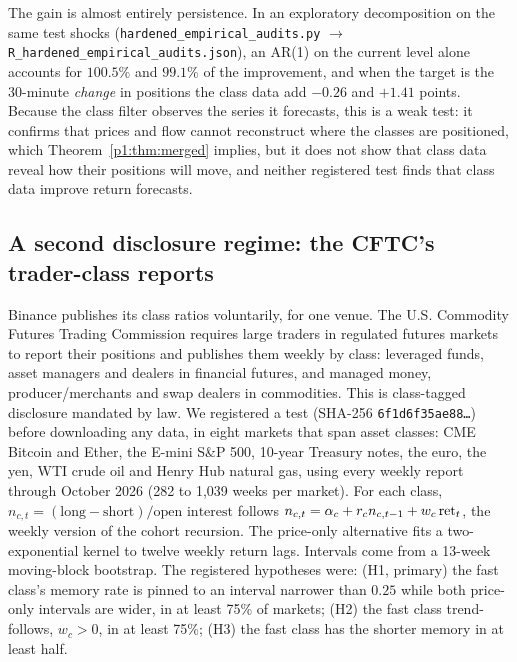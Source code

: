 The gain is almost entirely persistence. In an exploratory decomposition on the same test shocks (\texttt{hardened\_empirical\_audits.py} $\to$ \texttt{R\_hardened\_empirical\_audits.json}), an AR(1) on the current level alone accounts for $100.5\%$ and $99.1\%$ of the improvement, and when the target is the 30-minute \emph{change} in positions the class data add $-0.26$ and $+1.41$ points. Because the class filter observes the series it forecasts, this is a weak test: it confirms that prices and flow cannot reconstruct where the classes are positioned, which Theorem~\ref{p1:thm:merged} implies, but it does not show that class data reveal how their positions will move, and neither registered test finds that class data improve return forecasts.

\subsection{A second disclosure regime: the CFTC's trader-class reports}\label{p1:sec:cot}

Binance publishes its class ratios voluntarily, for one venue. The U.S. Commodity Futures Trading Commission requires large traders in regulated futures markets to report their positions and publishes them weekly by class: leveraged funds, asset managers and dealers in financial futures, and managed money, producer/merchants and swap dealers in commodities. This is class-tagged disclosure mandated by law. We registered a test (SHA-256 \texttt{6f1d6f35ae88\ldots}) before downloading any data, in eight markets that span asset classes: CME Bitcoin and Ether, the E-mini S\&P 500, 10-year Treasury notes, the euro, the yen, WTI crude oil and Henry Hub natural gas, using every weekly report through October 2026 (282 to 1{,}039 weeks per market). For each class, $n_{c,t}=(\text{long}-\text{short})/\text{open interest}$ follows $n_{c,t}=\alpha_c+r_cn_{c,t-1}+w_c\,{\rm ret}_t$, the weekly version of the cohort recursion. The price-only alternative fits a two-exponential kernel to twelve weekly return lags. Intervals come from a 13-week moving-block bootstrap. The registered hypotheses were: (H1, primary) the fast class's memory rate is pinned to an interval narrower than $0.25$ while both price-only intervals are wider, in at least 75\% of markets; (H2) the fast class trend-follows, $w_c>0$, in at least 75\%; (H3) the fast class has the shorter memory in at least half.

